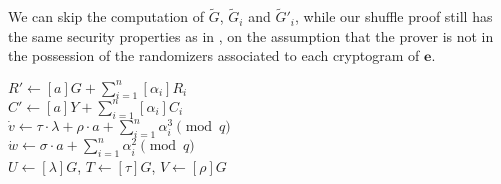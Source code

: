 We can skip the computation of $\tilde{G}$, $\tilde{G}_i$ and $\tilde{G}'_i$, while our shuffle proof still has the same security properties as in \cite{Furukawa01}, on the assumption that the prover is not in the possession of the randomizers associated to each cryptogram of $\boldsymbol{e}$.

\begin{algorithm}[hp]
\DontPrintSemicolon
    \caption{\( \mathbf{ShuffleCommit}_Y (\boldsymbol{e}, \boldsymbol{r'}, \psi, \sigma, \rho, \tau, \lambda, a, \boldsymbol{\alpha}, \boldsymbol{\lambda}) \)}
    \( R' \gets [a]G + \sum_{i=1}^n [\alpha_i]R_i \) \\
    \( C' \gets [a]Y + \sum_{i=1}^n [\alpha_i]C_i \) \\ [2mm]
    \( \dot{v} \gets \tau \cdot \lambda + \rho \cdot a + \sum_{i=1}^n \alpha_i^3 \pmod q \) \\
    \( \dot{w} \gets \sigma \cdot a + \sum_{i=1}^n \alpha_i^2 \pmod q \) \\ [2mm]
    \( U \gets [\lambda]G \), \( T \gets [\tau]G \), \( V \gets [\rho]G \) \\

\end{algorithm}
